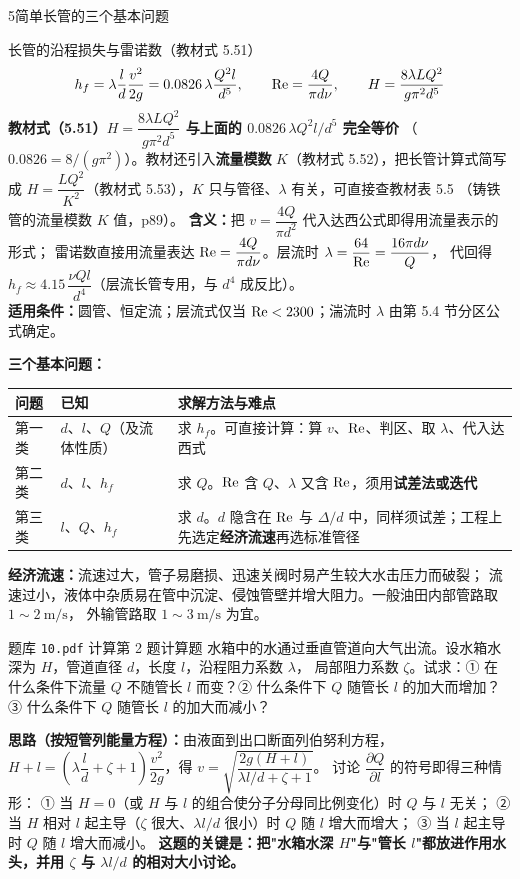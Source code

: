 \begin{kaodian}{5}{简单长管的三个基本问题}
\begin{gongshi}{长管的沿程损失与雷诺数（教材式 5.51）}
\[ h_f=\lambda\frac{l}{d}\frac{v^2}{2g}=0.0826\,\lambda\frac{Q^2l}{d^5},\qquad
   \mathrm{Re}=\frac{4Q}{\pi d\nu},\qquad H=\frac{8\lambda LQ^2}{g\pi^2d^5} \]
\textbf{教材式（5.51）$H=\dfrac{8\lambda LQ^2}{g\pi^2d^5}$ 与上面的 $0.0826\,\lambda Q^2l/d^5$ 完全等价}
（$0.0826=8/(g\pi^2)$）。教材还引入\textbf{流量模数} $K$（教材式 5.52），把长管计算式简写成
$H=\dfrac{LQ^2}{K^2}$（教材式 5.53），$K$ 只与管径、$\lambda$ 有关，可直接查教材表 5.5
（铸铁管的流量模数 $K$ 值，p89）。
\textbf{含义：}把 $v=\dfrac{4Q}{\pi d^2}$ 代入达西公式即得用流量表示的形式；
雷诺数直接用流量表达 $\mathrm{Re}=\dfrac{4Q}{\pi d\nu}$。层流时 $\lambda=\dfrac{64}{\mathrm{Re}}=\dfrac{16\pi d\nu}{Q}$，
代回得 $h_f\approx4.15\,\dfrac{\nu Ql}{d^4}$（层流长管专用，与 $d^4$ 成反比）。\\
\textbf{适用条件：}圆管、恒定流；层流式仅当 $\mathrm{Re}<2300$；湍流时 $\lambda$ 由第 5.4 节分区公式确定。
\end{gongshi}

\textbf{三个基本问题：}
\begin{center}
\begin{tabularx}{\textwidth}{@{}lXX@{}}
\toprule
问题 & 已知 & 求解方法与难点 \\
\midrule
第一类 & $d$、$l$、$Q$（及流体性质） & 求 $h_f$。可直接计算：算 $v$、$\mathrm{Re}$、判区、取 $\lambda$、代入达西式 \\
第二类 & $d$、$l$、$h_f$ & 求 $Q$。$\mathrm{Re}$ 含 $Q$、$\lambda$ 又含 $\mathrm{Re}$，须用\textbf{试差法或迭代} \\
第三类 & $l$、$Q$、$h_f$ & 求 $d$。$d$ 隐含在 $\mathrm{Re}$ 与 $\Delta/d$ 中，同样须试差；工程上先选定\textbf{经济流速}再选标准管径 \\
\bottomrule
\end{tabularx}
\end{center}

\textbf{经济流速：}流速过大，管子易磨损、迅速关阀时易产生较大水击压力而破裂；
流速过小，液体中杂质易在管中沉淀、侵蚀管壁并增大阻力。一般油田内部管路取 $1\sim2\ \mathrm{m/s}$，
外输管路取 $1\sim3\ \mathrm{m/s}$ 为宜。

\begin{zhenti}{题库 \texttt{10.pdf} 计算第 2 题}{计算题}
水箱中的水通过垂直管道向大气出流。设水箱水深为 $H$，管道直径 $d$，长度 $l$，沿程阻力系数 $\lambda$，
局部阻力系数 $\zeta$。试求：① 在什么条件下流量 $Q$ 不随管长 $l$ 而变？② 什么条件下 $Q$ 随管长 $l$ 的加大而增加？
③ 什么条件下 $Q$ 随管长 $l$ 的加大而减小？
\end{zhenti}
\noindent\textbf{思路（按短管列能量方程）：}由液面到出口断面列伯努利方程，
$H+l=\left(\lambda\dfrac{l}{d}+\zeta+1\right)\dfrac{v^2}{2g}$，得
$v=\sqrt{\dfrac{2g(H+l)}{\lambda l/d+\zeta+1}}$。
讨论 $\dfrac{\partial Q}{\partial l}$ 的符号即得三种情形：
① 当 $H=0$（或 $H$ 与 $l$ 的组合使分子分母同比例变化）时 $Q$ 与 $l$ 无关；
② 当 $H$ 相对 $l$ 起主导（$\zeta$ 很大、$\lambda l/d$ 很小）时 $Q$ 随 $l$ 增大而增大；
③ 当 $l$ 起主导时 $Q$ 随 $l$ 增大而减小。
\textbf{这题的关键是：把"水箱水深 $H$"与"管长 $l$"都放进作用水头，并用 $\zeta$ 与 $\lambda l/d$ 的相对大小讨论。}


\end{kaodian}
